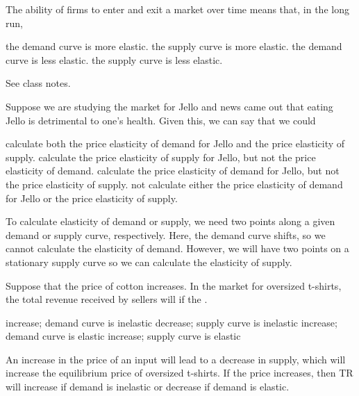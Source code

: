 \documentclass[addpoints,11pt]{exam}
\theoremstyle{definition}
\newcommand{\blank}[0]{\underline{\hspace{3cm}}}
\begin{document}
\begin{questions}

	\question The ability of firms to enter and exit a market over time means that, in the long run,
	
	\begin{choices}
		\choice the demand curve is more elastic.
		\CorrectChoice the supply curve is more elastic.
		\choice the demand curve is less elastic.
		\choice the supply curve is less elastic.
	\end{choices}
	
	\begin{solution}
		See class notes.
	\end{solution}
	
	\question Suppose we are studying the market for Jello and news came out that eating Jello is detrimental to one's health.  Given this, we can say that we could
	
		\begin{choices}
			\choice calculate both the price elasticity of demand for Jello and the price elasticity of supply. 
			\CorrectChoice calculate the price elasticity of supply for Jello, but not the price elasticity of demand.
			\choice calculate the price elasticity of demand for Jello, but not the price elasticity of supply.
			\choice not calculate either the price elasticity of demand for Jello or the price elasticity of supply.
		\end{choices}
		
		\begin{solution}
			To calculate elasticity of demand or supply, we need two points along a given demand or supply curve, respectively. Here, the demand curve shifts, so we cannot calculate the elasticity of demand. However, we will have two points on a stationary supply curve so we can calculate the elasticity of supply.
		\end{solution}
	

	\question Suppose that the price of cotton increases. In the market for oversized t-shirts, the total revenue received by sellers will \blank if the \blank.
	
	\begin{choices}
		\CorrectChoice increase; demand curve is inelastic
		\choice decrease; supply curve is inelastic
		\choice increase; demand curve is elastic
		\choice increase; supply curve is elastic
	\end{choices}
	
		\begin{solution}
			An increase in the price of an input will lead to a decrease in supply, which will increase the equilibrium price of oversized t-shirts. If the price increases, then TR will increase if demand is inelastic or decrease if demand is elastic.
		\end{solution}
		

\end{questions}
\end{document}
